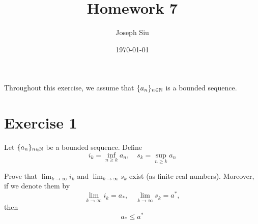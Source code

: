 \documentclass{homework}
\author{Joseph Siu}
\date{\today}
\title{Homework 7}
\newcommand{\N}{\bb{N}} %
\newcommand{\ra}{\rightarrow}
\newcommand{\?}{\stackrel{?}{=}}
\theoremstyle{definition}
\begin{document}
 \maketitle


Throughout this exercise, we assume that $\{a_n\}_{n\in\N}$ is a bounded sequence.

\section*{Exercise 1}
Let $\{a_n\}_{n\in\N}$ be a bounded sequence. Define \[i_k=\inf_{n\geq k}a_n, \quad s_k=\sup_{n\geq k}a_n\]

\question[1] Prove that $\lim_{k\ra\infty}i_k$ and $\lim_{k\ra\infty}s_k$ exist (as finite real numbers). Moreover, if we denote them by \[\lim_{k\ra\infty}i_k=a_*, \quad \lim_{k\ra\infty}s_k=a^*,\] then \[a_*\leq a^*\]
\end{document}
